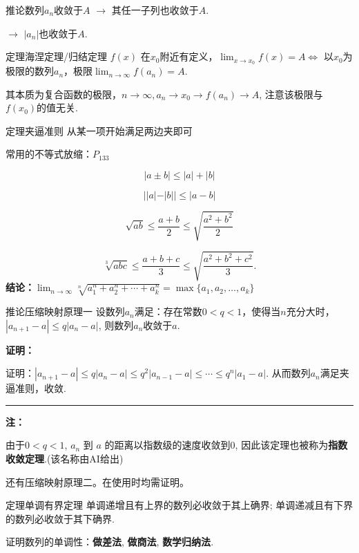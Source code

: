\documentclass[a4paper,12pt,oneside,fontset=none]{ctexbook}
\renewcommand{\le}{\leqslant}
\let\oldlim\lim
\renewcommand{\lim}{\displaystyle\oldlim}
\newcounter{theorem}[chapter]
\newenvironment{theorem}[1][]{\begin{thmBox}{定理}{#1}}{\end{thmBox}}
\newenvironment{corollary}[1][]{\begin{thmBox}{推论}{#1}}{\end{thmBox}}
\newenvironment{note}{
    \par\vspace{0.5em}\noindent
    \textbf{\color{NoteColor} 注：}
}{
    \par\vspace{0.5em}
}
\renewenvironment{proof}{
    \par\vspace{0.5em}\noindent
    \textbf{\color{LogicColor} 证明：}
}{
    \hfill \textcolor{LogicColor}{\rule{0.6em}{0.6em}} \par
}
\numberwithin{equation}{chapter}
\begin{document}
\begin{corollary}[数列${a_n}$收敛于$A$]
$\rightarrow$  其任一子列也收敛于$A$.

$\rightarrow$  ${|a_n|}$也收敛于$A$.
\end{corollary}


\begin{theorem}[海涅定理/归结定理]
$f(x)$ 在$x_0$附近有定义，$\lim_{x \to x_0}f(x) = A \Leftrightarrow$ 以$x_0$为极限的数列${a_n}$，极限$\lim_{n\to\infty} f(a_n) = A$.

其本质为复合函数的极限，$n\to\infty, a_n \to x_0 \rightarrow f(a_n) \rightarrow A$, 注意该极限与$f(x_0)$的值无关.
\end{theorem}


\begin{theorem}[夹逼准则]
从某一项开始满足两边夹即可

常用的不等式放缩：$P_{133}$

$$|a\pm b| \le |a| + |b|$$

$$||a|-|b|| \le |a-b|$$

$$\sqrt{ab} \le \frac{a+b}{2} \le \sqrt{\frac{a^2+b^2}{2}}$$

$$
\sqrt[3]{abc}\le \frac{a+b+c}{3}\le \sqrt{\frac{a^2+b^2+c^2}{3}}.
$$
\textbf{结论：}$\lim_{n \to \infty} \sqrt[n]{a_1^n + a_2^n + \cdots + a_k^n} = \max\{a_1, a_2, \ldots, a_k\}$
\end{theorem}

\begin{corollary}[压缩映射原理一]
设数列${a_n}$满足：存在常数$0<q<1$，使得当$n$充分大时，$|a_{n+1}-a|\le q|a_n-a|$, 则数列${a_n}$收敛于$a$.
\end{corollary}
\begin{proof}
证明：$|a_{n+1}-a|\le q|a_n-a|\le q^2|a_{n-1}-a|\le \cdots \le q^{n}|a_1-a|$. 从而数列${a_n}$满足夹逼准则，收敛.
\end{proof}
\begin{note}
由于$0<q<1$, $a_n$ 到 $a$ 的距离以指数级的速度收敛到0, 因此该定理也被称为\textbf{指数收敛定理}.(该名称由AI给出)

还有压缩映射原理二。在使用时均需证明。
\end{note}   


\begin{theorem}[单调有界定理]
单调递增且有上界的数列必收敛于其上确界; 单调递减且有下界的数列必收敛于其下确界.

证明数列的单调性：\textbf{做差法}, \textbf{做商法}, \textbf{数学归纳法}.
\end{theorem}                
\end{document}
